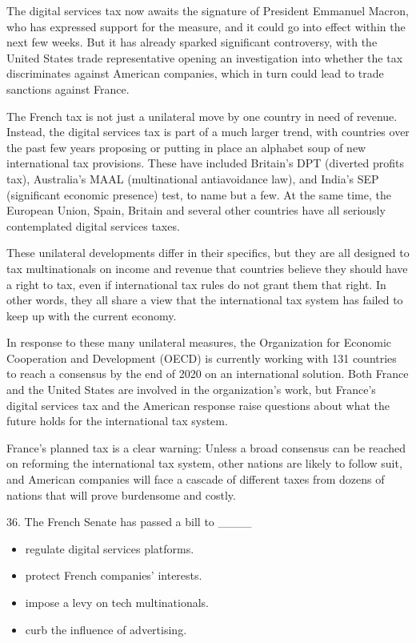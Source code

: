 \documentclass[UTF8,11pt]{ctexart}
\begin{document}
The digital services tax now awaits the signature of President Emmanuel Macron, who has expressed support for the measure, and it could go into effect within the next few weeks. But it has already sparked significant controversy, with the United States trade representative opening an investigation into whether the tax discriminates against American companies, which in turn could lead to trade sanctions against France.


The French tax is not just a unilateral move by one country in need of revenue. Instead, the digital services tax is part of a much larger trend, with countries over the past few years proposing or putting in place an alphabet soup of new international tax provisions. These have included Britain’s DPT (diverted profits tax), Australia’s MAAL (multinational antiavoidance law), and India’s SEP (significant economic presence) test, to name but a few. At the same time, the European Union, Spain, Britain and several other countries have all seriously contemplated digital services taxes.


These unilateral developments differ in their specifics, but they are all designed to tax multinationals on income and revenue that countries believe they should have a right to tax, even if international tax rules do not grant them that right. In other words, they all share a view that the international tax system has failed to keep up with the current economy.


In response to these many unilateral measures, the Organization for Economic Cooperation and Development (OECD) is currently working with 131 countries to reach a consensus by the end of 2020 on an international solution. Both France and the United States are involved in the organization’s work, but France’s digital services tax and the American response raise questions about what the future holds for the international tax system.


France’s planned tax is a clear warning: Unless a broad consensus can be reached on reforming the international tax system, other nations are likely to follow suit, and American companies will face a cascade of different taxes from dozens of nations that will prove burdensome and costly.


36. The French Senate has passed a bill to \_\_\_\_


\begin{itemize}[leftmargin=2em,itemsep=.2em,topsep=.4em]\item[A.] regulate digital services platforms.
\item[B.] protect French companies’ interests.
\item[C.] impose a levy on tech multinationals.
\item[D.] curb the influence of advertising.
\end{itemize}
\end{document}

